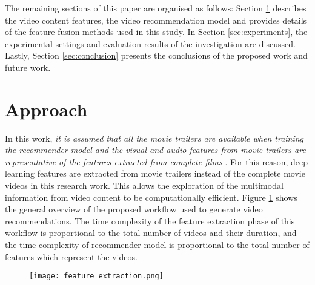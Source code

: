 \documentclass[review]{elsarticle}
\begin{document}
The remaining sections of this paper are organised as follows: Section \ref{sec:approach} describes the video content features, the video recommendation model and provides details of the feature fusion methods used in this study. In Section \ref{sec:experiments}, the experimental settings and evaluation results of the investigation are discussed. Lastly, Section \ref{sec:conclusion} presents the conclusions of the proposed work and future work.



\section{Approach}\label{sec:approach}
In this work, \textit{it is assumed that all the movie trailers are available when training the recommender model and the visual and audio features from movie trailers are representative of the features extracted from complete films} \citep{deldjoo2019movie, deldjoo2016content}. For this reason, deep learning features are extracted from movie trailers instead of the complete movie videos in this research work. This allows the exploration of the multimodal information from video content to be computationally efficient. Figure \ref{recsys} shows the general overview of the proposed workflow used to generate video recommendations. The time complexity of the feature extraction phase of this workflow is proportional to the total number of videos and their duration, and the time complexity of recommender model is proportional to the total number of features which represent the videos. 

\begin{figure}[H]
\centering

\texttt{[image: feature\_extraction.png]}
\label{recsys}

\end{figure}
\end{document}
